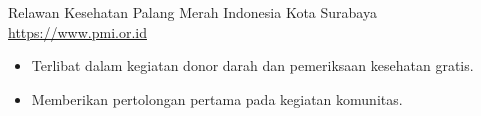 \documentclass[a4paper, serif, 10pt]{moderncv}
\begin{document}
        {Relawan Kesehatan}
        {Palang Merah Indonesia Kota Surabaya}
        {\url{https://www.pmi.or.id}}
        {}
        {\begin{itemize}
\item Terlibat dalam kegiatan donor darah dan pemeriksaan kesehatan gratis.
\item Memberikan pertolongan pertama pada kegiatan komunitas.
\end{itemize}}
    
\end{document}
